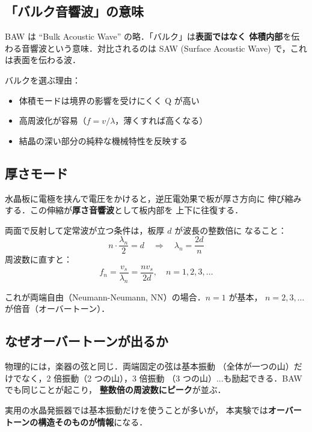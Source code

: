 \documentclass[11pt,a4paper]{article}
\begin{document}
\subsection{「バルク音響波」の意味}

BAW は ``Bulk Acoustic Wave'' の略．「バルク」は\textbf{表面ではなく
体積内部}を伝わる音響波という意味．対比されるのは SAW
(Surface Acoustic Wave) で，これは表面を伝わる波．

バルクを選ぶ理由：
\begin{itemize}
\item 体積モードは境界の影響を受けにくく Q が高い
\item 高周波化が容易（$f = v/\lambda$，薄くすれば高くなる）
\item 結晶の深い部分の純粋な機械特性を反映する
\end{itemize}

\subsection{厚さモード}

水晶板に電極を挟んで電圧をかけると，逆圧電効果で板が厚さ方向に
伸び縮みする．この伸縮が\textbf{厚さ音響波}として板内部を
上下に往復する．

両面で反射して定常波が立つ条件は，板厚 $d$ が波長の整数倍に
なること：
\begin{equation}
n \cdot \frac{\lambda_n}{2} = d \quad\Rightarrow\quad \lambda_n = \frac{2d}{n}
\end{equation}
周波数に直すと：
\begin{equation}
f_n = \frac{v_s}{\lambda_n} = \frac{n v_s}{2 d}, \quad n = 1, 2, 3, \ldots
\end{equation}

これが両端自由（Neumann-Neumann, NN）の場合．$n=1$ が基本，
$n=2, 3, \ldots$ が倍音（オーバートーン）．

\subsection{なぜオーバートーンが出るか}

物理的には，楽器の弦と同じ．両端固定の弦は基本振動
（全体が一つの山）だけでなく，2 倍振動（2 つの山），3 倍振動
（3 つの山）...も励起できる．BAW でも同じことが起こり，
\textbf{整数倍の周波数にピーク}が並ぶ．

実用の水晶発振器では基本振動だけを使うことが多いが，
本実験では\textbf{オーバートーンの構造そのものが情報}になる．
\end{document}
